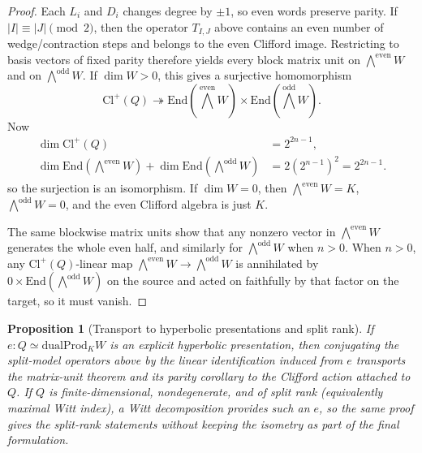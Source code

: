 \documentclass{birkjour}
\theoremstyle{plain}
\newtheorem{proposition}[theorem]{Proposition}
\theoremstyle{definition}
\theoremstyle{remark}
\newcommand{\Cl}{\mathrm{Cl}}
\newcommand{\End}{\mathrm{End}}
\newcommand{\dualProd}{\mathrm{dualProd}}
\newcommand{\wedgeEven}{\bigwedge^{\mathrm{even}} W}
\newcommand{\wedgeOdd}{\bigwedge^{\mathrm{odd}} W}
\begin{document}
\begin{proof}
Each $L_i$ and $D_i$ changes degree by $\pm 1$, so even words preserve parity.
If $|I|\equiv |J|\pmod 2$, then the operator $T_{I,J}$ above contains an even
number of wedge/contraction steps and belongs to the even Clifford image.
Restricting to basis vectors of fixed parity therefore yields every block matrix
unit on $\wedgeEven$ and on $\wedgeOdd$. If $\dim W>0$, this gives a surjective
homomorphism
\[
  \Cl^+(Q)\twoheadrightarrow \End(\wedgeEven)\times \End(\wedgeOdd).
\]
Now
\[
  \begin{aligned}
  \dim \Cl^+(Q) &= 2^{2n-1}, \\
  \dim \End(\wedgeEven)+\dim \End(\wedgeOdd)
    &= 2(2^{n-1})^2 = 2^{2n-1}.
  \end{aligned}
\]
so the surjection is an isomorphism. If $\dim W=0$, then $\wedgeEven=K$,
$\wedgeOdd=0$, and the even Clifford algebra is just $K$.

The same blockwise matrix units show that any nonzero vector in $\wedgeEven$
generates the whole even half, and similarly for $\wedgeOdd$ when $n>0$.
When $n>0$, any $\Cl^+(Q)$-linear map $\wedgeEven\to\wedgeOdd$ is annihilated by
$0\times \End(\wedgeOdd)$ on the source and acted on faithfully by that factor
on the target, so it must vanish.
\end{proof}

\begin{proposition}[Transport to hyperbolic presentations and split rank]
\label{prop:transport-split}
If $e:Q \simeq \dualProd_K W$ is an explicit hyperbolic presentation, then
conjugating the split-model operators above by the linear identification
induced from $e$ transports the matrix-unit theorem and its parity corollary to
the Clifford action attached to $Q$. If $Q$ is finite-dimensional,
nondegenerate, and of split rank (equivalently maximal Witt index), a Witt decomposition provides
such an $e$, so the same proof gives the split-rank statements without keeping
the isometry as part of the final formulation.
\end{proposition}
\end{document}
